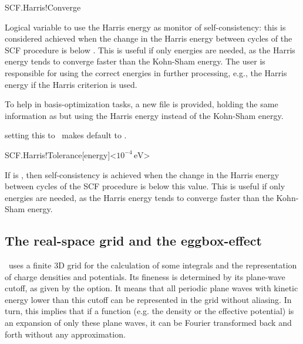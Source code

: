 \begin{fdflogicalF}{SCF.Harris!Converge}

  Logical variable to use the Harris energy as monitor of
  self-consistency: this is considered achieved when the change in the
  Harris energy between cycles of the SCF procedure is below
  . This is useful if only
  energies are needed, as the Harris energy tends to converge faster
  than the Kohn-Sham energy. The user is responsible for using the
  correct energies in further processing, e.g., the Harris energy if
  the Harris criterion is used.

  To help in basis-optimization tasks, a new file
   is provided, holding the same
  information as  but using the Harris energy
  instead of the Kohn-Sham energy.

  \note setting this to \fdftrue\ makes 
   default to \fdffalse.

\end{fdflogicalF}

\begin{fdfentry}{SCF.Harris!Tolerance}[energy]<$10^{-4}\,\mathrm{eV}$>

  If  is \fdftrue, then self-consistency is
  achieved when the change in the Harris energy between cycles of the
  SCF procedure is below this value. This is useful if only energies
  are needed, as the Harris energy tends to converge faster than the
  Kohn-Sham energy.
  
\end{fdfentry}



\vspace{5pt}
\subsection{The real-space grid and the eggbox-effect}

\siesta\ uses a finite 3D grid for the calculation of some
integrals and the representation of charge densities and potentials.
Its fineness is determined by its plane-wave cutoff, as
given by the  option. It means that all periodic
plane waves with kinetic energy lower than this cutoff 
can be represented in the grid without aliasing. In turn,
this implies that if a function (e.g. the density or the 
effective potential) is an expansion of
only these plane waves, it can be Fourier transformed
back and forth without any approximation.

